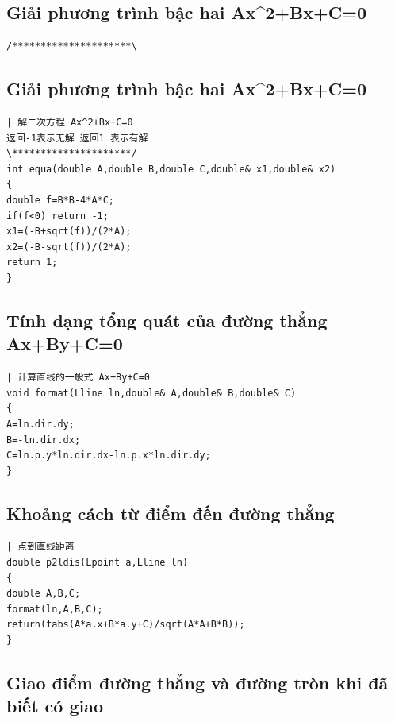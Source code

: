 \documentclass[11pt]{article}
\begin{document}
\subsection{Giải phương trình bậc hai Ax\textasciicircum{}2+Bx+C=0}

\begingroup
\scriptsize
\begin{verbatim}
/*********************\
\end{verbatim}
\endgroup

\subsection{Giải phương trình bậc hai Ax\textasciicircum{}2+Bx+C=0}

\begingroup
\scriptsize
\begin{verbatim}
| 解二次方程 Ax^2+Bx+C=0
返回-1表示无解 返回1 表示有解
\*********************/
int equa(double A,double B,double C,double& x1,double& x2)
{
double f=B*B-4*A*C;
if(f<0) return -1;
x1=(-B+sqrt(f))/(2*A);
x2=(-B-sqrt(f))/(2*A);
return 1;
}
\end{verbatim}
\endgroup

\subsection{Tính dạng tổng quát của đường thẳng Ax+By+C=0}

\begingroup
\scriptsize
\begin{verbatim}
| 计算直线的一般式 Ax+By+C=0
void format(Lline ln,double& A,double& B,double& C)
{
A=ln.dir.dy;
B=-ln.dir.dx;
C=ln.p.y*ln.dir.dx-ln.p.x*ln.dir.dy;
}
\end{verbatim}
\endgroup

\subsection{Khoảng cách từ điểm đến đường thẳng}

\begingroup
\scriptsize
\begin{verbatim}
| 点到直线距离
double p2ldis(Lpoint a,Lline ln)
{
double A,B,C;
format(ln,A,B,C);
return(fabs(A*a.x+B*a.y+C)/sqrt(A*A+B*B));
}
\end{verbatim}
\endgroup

\subsection{Giao điểm đường thẳng và đường tròn khi đã biết có giao}
\end{document}
